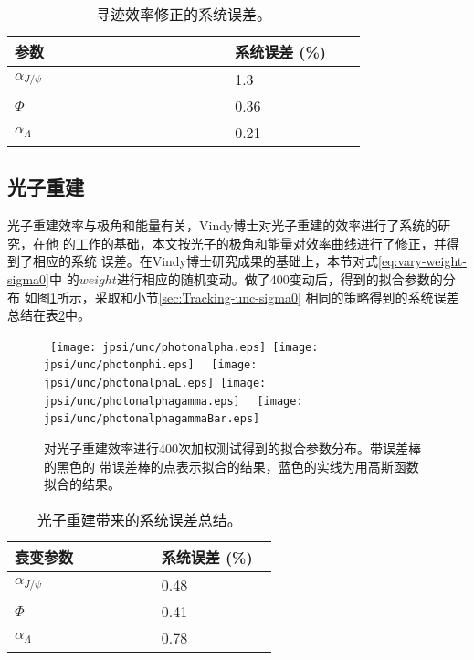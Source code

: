 \begin{table}[htbp]
    \caption{寻迹效率修正的系统误差。}%
    \label{tab:unc-track-sigma0}
    \begin{center}
        \begin{tabular} {p{0.5 \linewidth} p{0.3 \linewidth}}
            \toprule 
            参数 & 系统误差 (\%) \\
            \midrule
            $\alpha_{J/\psi}$  & 1.3 \\
            $\Phi$             & 0.36 \\
            $\alpha_{\Lambda}$ & 0.21 \\
            \bottomrule
        \end{tabular}
    \end{center}
\end{table}

\subsection{光子重建}%
\label{sec:photon-rec-Sigma0}
光子重建效率与极角和能量有关，Vindy博士对光子重建的效率进行了系统的研究，在他
的工作的基础，本文按光子的极角和能量对效率曲线进行了修正，并得到了相应的系统
误差。在Vindy博士研究成果的基础上，本节对式\ref{eq:vary-weight-sigma0}中
的$weight$进行相应的随机变动。做了400变动后，得到的拟合参数的分布
如图\ref{fig:fit-value-photon}所示，采取和小节\ref{sec:Tracking-unc-sigma0}
相同的策略得到的系统误差总结在表\ref{tab:unc-photon-Sigma}中。
\begin{figure}[htbp]
    \centering
    \mbox{%
        \texttt{[image: jpsi/unc/photonalpha.eps]}
        \texttt{[image: jpsi/unc/photonphi.eps]}
    }
    \mbox{%
        \texttt{[image: jpsi/unc/photonalphaL.eps]}
        \texttt{[image: jpsi/unc/photonalphagamma.eps]}
    }
    \mbox{%
        \texttt{[image: jpsi/unc/photonalphagammaBar.eps]}
    }
    \caption{%
        对光子重建效率进行400次加权测试得到的拟合参数分布。带误差棒的黑色的
        带误差棒的点表示拟合的结果，蓝色的实线为用高斯函数拟合的结果。
    }%
    \label{fig:fit-value-photon}
\end{figure}

\begin{table}[htbp]
    \caption{光子重建带来的系统误差总结。}%
    \label{tab:unc-photon-Sigma}
    \centering
    \begin{tabular} {p{0.5 \linewidth} p{0.4 \linewidth}}
        \toprule 
        衰变参数 & 系统误差 (\%) \\
        \midrule
        $\alpha_{J/\psi}$  & 0.48 \\
        $\Phi$             & 0.41 \\
        $\alpha_{\Lambda}$ & 0.78 \\
        \bottomrule
    \end{tabular}
\end{table}


